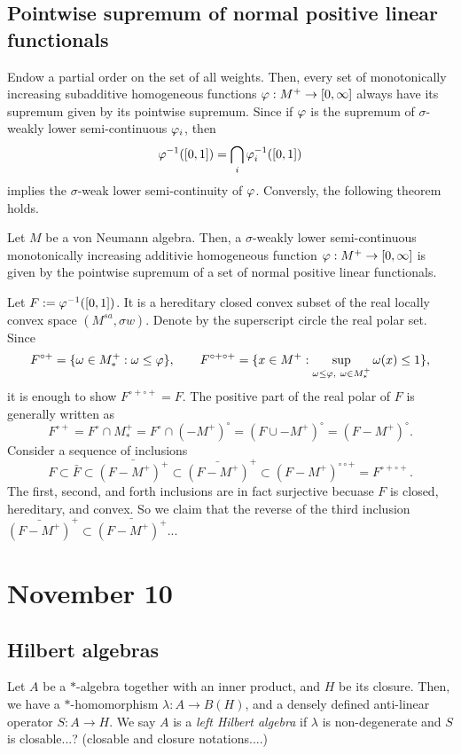 \documentclass{../../small}
\begin{document}
\subsection{Pointwise supremum of normal positive linear functionals}

Endow a partial order on the set of all weights.
Then, every set of monotonically increasing subadditive homogeneous functions $\varphi:M^+\to[0,\infty]$ always have its supremum given by its pointwise supremum.
Since if $\varphi$ is the supremum of $\sigma$-weakly lower semi-continuous $\varphi_i$, then
\[\varphi^{-1}([0,1])=\bigcap_i\varphi_i^{-1}([0,1])\]
implies the $\sigma$-weak lower semi-continuity of $\varphi$.
Conversly, the following theorem holds.

\begin{thm}
Let $M$ be a von Neumann algebra.
Then, a $\sigma$-weakly lower semi-continuous monotonically increasing additivie homogeneous function $\varphi:M^+\to[0,\infty]$ is given by the pointwise supremum of a set of normal positive linear functionals.
\end{thm}
\begin{pf}
Let $F:=\varphi^{-1}([0,1])$.
It is a hereditary closed convex subset of the real locally convex space $(M^{sa},\sigma w)$.
Denote by the superscript circle the real polar set.
Since
\[F^{\circ+}=\{\omega\in M_*^+:\omega\le\varphi\},\qquad
F^{\circ+\circ+}=\{x\in M^+:\sup_{\omega\le\varphi,\ \omega\in M_*^+}\omega(x)\le1\},\]
it is enough to show $F^{\circ+\circ+}=F$.
The positive part of the real polar of $F$ is generally written as
\[F^{\circ+}=F^\circ\cap M_*^+=F^\circ\cap(-M^+)^\circ=(F\cup-M^+)^\circ=(F-M^+)^\circ.\]
Consider a sequence of inclusions
\[F\subset\bar F\subset\bar{(F-M^+)^+}\subset\bar{(F-M^+)}^+\subset(F-M^+)^{\circ\circ+}=F^{\circ+\circ+}.\]
The first, second, and forth inclusions are in fact surjective becuase $F$ is closed, hereditary, and convex.
So we claim that the reverse of the third inclusion $\bar{(F-M^+)}^+\subset\bar{(F-M^+)^+}$...
\end{pf}





\newpage
\section{November 10}
\subsection{Hilbert algebras}

Let $A$ be a $*$-algebra together with an inner product, and $H$ be its closure.
Then, we have a $*$-homomorphism $\lambda:A\to B(H)$, and a densely defined anti-linear operator $S:A\to H$.
We say $A$ is a \emph{left Hilbert algebra} if $\lambda$ is non-degenerate and $S$ is closable...?
(closable and closure notations....)
\end{document}
